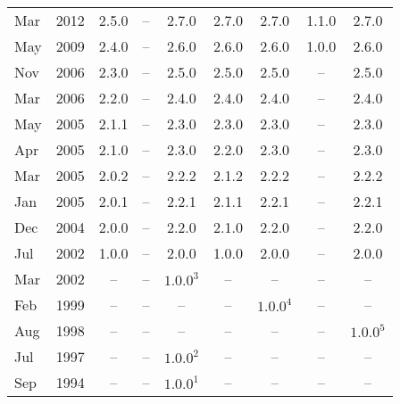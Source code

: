 \begin{xtabular}{|ll|c|c|c|c|c|c|c|}
Mar & 2012 & 2.5.0       & --          & 2.7.0         & 2.7.0       & 2.7.0       & 1.1.0       & 2.7.0\\
May & 2009 & 2.4.0       & --          & 2.6.0         & 2.6.0       & 2.6.0       & 1.0.0       & 2.6.0\\
Nov & 2006 & 2.3.0       & --          & 2.5.0         & 2.5.0       & 2.5.0       & --          & 2.5.0\\
Mar & 2006 & 2.2.0       & --          & 2.4.0         & 2.4.0       & 2.4.0       & --          & 2.4.0\\
May & 2005 & 2.1.1       & --          & 2.3.0         & 2.3.0       & 2.3.0       & --          & 2.3.0\\
Apr & 2005 & 2.1.0       & --          & 2.3.0         & 2.2.0       & 2.3.0       & --          & 2.3.0\\
Mar & 2005 & 2.0.2       & --          & 2.2.2         & 2.1.2       & 2.2.2       & --          & 2.2.2\\
Jan & 2005 & 2.0.1       & --          & 2.2.1         & 2.1.1       & 2.2.1       & --          & 2.2.1\\
Dec & 2004 & 2.0.0       & --          & 2.2.0         & 2.1.0       & 2.2.0       & --          & 2.2.0\\
Jul & 2002 & 1.0.0       & --          & 2.0.0         & 1.0.0       & 2.0.0       & --          & 2.0.0\\
Mar & 2002 & --          & --          & $1.0.0^3$     & --          & --          & --          & --\\
Feb & 1999 & --          & --          & --            & --          & $1.0.0^4$   & --          & --\\
Aug & 1998 & --          & --          & --            & --          & --          & --          & $1.0.0^5$\\
Jul & 1997 & --          & --          & $1.0.0^2$     & --          & --          & --          & --\\
Sep & 1994 & --          & --          & $1.0.0^1$     & --          & --          & --          & --\\
\end{xtabular}
